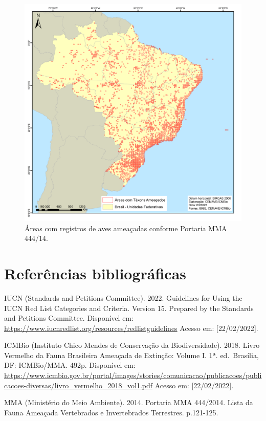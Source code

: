 \documentclass[
  oneside]{scrbook}
\begin{document}
\begin{figure}[H]

{\centering \includegraphics[width=0.75\linewidth]{imagens/cap03/Figura_3.3} 

}

\caption{Áreas com registros de aves ameaçadas conforme Portaria MMA 444/14.}\label{fig:11}
\end{figure}

\hypertarget{referuxeancias-bibliogruxe1ficas-2}{%
\section{Referências bibliográficas}\label{referuxeancias-bibliogruxe1ficas-2}}

IUCN (Standards and Petitions Committee). 2022. Guidelines for Using the IUCN Red List Categories and Criteria. Version 15. Prepared by the Standards and Petitions Committee. Disponível em: \url{https://www.iucnredlist.org/resources/redlistguidelines} Acesso em: {[}22/02/2022{]}.

ICMBio (Instituto Chico Mendes de Conservação da Biodiversidade). 2018. Livro Vermelho da Fauna Brasileira Ameaçada de Extinção: Volume I. 1ª. ed.~Brasília, DF: ICMBio/MMA. 492p. Disponível em: \url{https://www.icmbio.gov.br/portal/images/stories/comunicacao/publicacoes/publicacoes-diversas/livro_vermelho_2018_vol1.pdf} Acesso em: {[}22/02/2022{]}.

MMA (Ministério do Meio Ambiente). 2014. Portaria MMA 444/2014. Lista da Fauna Ameaçada Vertebrados e Invertebrados Terrestres. p.121-125.
\end{document}

